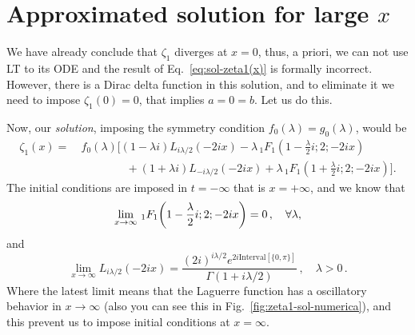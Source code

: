 \documentclass[%
 aip,
 jmp,%
 amsmath,amssymb,
 reprint,%
]{revtex4-2}
\begin{document}
\section{Approximated solution for large $x$}

We have already conclude that $\zeta_1$ diverges at $x = 0$, thus, a priori, we can not use LT to its ODE and the result of Eq.~\eqref{eq:sol-zeta1(x)} is formally incorrect. However, there is a Dirac delta function in this solution, and to eliminate it we need to impose $\zeta_1(0) = 0$, that implies $a = 0 = b$. Let us do this.

Now, our \textit{solution}, imposing the symmetry condition $f_0(\lambda) = g_0(\lambda)$, would be
\begin{equation}\label{eq:approx-sol-zeta1-largex}
\begin{aligned}
    \zeta_1(x)= &~{} f_0(\lambda)\Bigg[  (1-\lambda i)  L_{i \lambda/2}(-2 i x)  - \lambda \, _1F_1\left(1- \frac{\lambda}2 i ;2;-2 i x \right) \\
    &~{} \qquad\qquad +  (1+ \lambda i)L_{-i \lambda/2}(-2 i x) + \lambda \, _1F_1\left(1+  \frac{\lambda}2i ;2;-2 i x \right)\Bigg].
\end{aligned}
\end{equation}
The initial conditions are imposed in $t = -\infty$ that is $x = +\infty$, and we know that
\begin{equation*}
    \lim_{x\to\infty}\,_1F_1\qty(1-\frac{\lambda}{2}i;2;-2ix)=0\,, \quad \forall \lambda,
\end{equation*}
and
\begin{equation*}
    \lim_{x\to\infty}L_{i\lambda/2}(-2ix)=\frac{(2i)^{i\lambda/2}e^{2i\text{Interval}[\{0,\pi\}]}}{\Gamma(1+i\lambda/2)}\,,\quad \lambda>0\,.
\end{equation*}
Where the latest limit means that the Laguerre function has a oscillatory behavior in $x \to \infty$ (also you can see this in Fig.~\eqref{fig:zeta1-sol-numerica}), and this prevent us to impose initial conditions at $x = \infty$.
\end{document}
